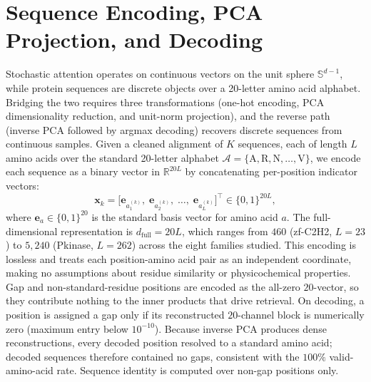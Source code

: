 \section{Sequence Encoding, PCA Projection, and Decoding}\label{si:pca}

Stochastic attention operates on continuous vectors on the unit sphere $\mathbb{S}^{d-1}$, while protein sequences are discrete objects over a 20-letter amino acid alphabet. Bridging the two requires three transformations (one-hot encoding, PCA dimensionality reduction, and unit-norm projection), and the reverse path (inverse PCA followed by argmax decoding) recovers discrete sequences from continuous samples. Given a cleaned alignment of $K$ sequences, each of length $L$ amino acids over the standard 20-letter alphabet $\mathcal{A} = \{\text{A}, \text{R}, \text{N}, \ldots, \text{V}\}$, we encode each sequence as a binary vector in $\mathbb{R}^{20L}$ by concatenating per-position indicator vectors:
\begin{equation}
    \mathbf{x}_k = \bigl[\mathbf{e}_{a_1^{(k)}},\; \mathbf{e}_{a_2^{(k)}},\; \ldots,\; \mathbf{e}_{a_L^{(k)}}\bigr]^\top \in \{0,1\}^{20L},
\end{equation}
where $\mathbf{e}_a \in \{0,1\}^{20}$ is the standard basis vector for amino acid $a$. The full-dimensional representation is $d_{\mathrm{full}} = 20L$, which ranges from $460$ (zf-C2H2, $L{=}23$) to $5{,}240$ (Pkinase, $L{=}262$) across the eight families studied. This encoding is lossless and treats each position-amino acid pair as an independent coordinate, making no assumptions about residue similarity or physicochemical properties. Gap and non-standard-residue positions are encoded as the all-zero $20$-vector, so they contribute nothing to the inner products that drive retrieval. On decoding, a position is assigned a gap only if its reconstructed $20$-channel block is numerically zero (maximum entry below $10^{-10}$). Because inverse PCA produces dense reconstructions, every decoded position resolved to a standard amino acid; decoded sequences therefore contained no gaps, consistent with the $100\%$ valid-amino-acid rate. Sequence identity is computed over non-gap positions only.

